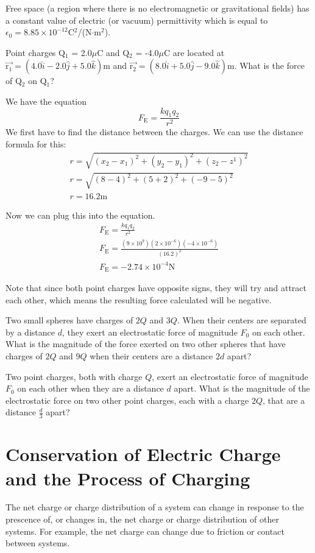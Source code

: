 \documentclass[../em.tex]{subfiles}
\begin{document}
Free space (a region where there is no electromagnetic or gravitational fields) has a 
constant value of electric (or vacuum) permittivity which is equal to $\epsilon_0 = 8.85\times10^{-12}$C$^2$/(N$\cdot$m$^2$).
\begin{example}
    Point charges Q$_1$ = 2.0$\mu$C and Q$_2$ = -4.0$\mu$C are located at $\vec{\text{r}_1} = (4.0\hat{i}-2.0\hat{j}+5.0\hat{k})$m and 
    $\vec{\text{r}_2} = (8.0\hat{i}+5.0\hat{j}-9.0\hat{k})$m. What is the force of Q$_2$ on Q$_1$?

    We have the equation 
    \[F_\text{E}=\frac{kq_1q_2}{r^2}\]
    We first have to find the distance between the charges. We can use the distance formula for this:
    \begin{align*}
        r = \sqrt{(x_2-x_1)^2+(y_2-y_1)^2+(z_2-z^1)^2}\\
        r = \sqrt{(8-4)^2+(5+2)^2+(-9-5)^2}\\
        r = 16.2 \text{m}
    \end{align*}

    Now we can plug this into the equation.
    \begin{align*}
        F_\text{E}=\frac{kq_1q_2}{r^2}\\
        F_\text{E}=\frac{(9\times10^9)(2\times10^{-6})(-4\times10^{-6})}{(16.2)^2}\\
        F_\text{E}=-2.74\times10^{-4}\text{N}
    \end{align*}

    Note that since both point charges have opposite signs, they will try and attract each other, which means the resulting force calculated 
    will be negative.
\end{example}

\ex Two small spheres have charges of $2Q$ and $3Q$. When their centers are separated by a distance $d$, they exert an electrostatic force of magnitude $F_0$ on each other. What is the magnitude of the force exerted on two other spheres that have charges of $2Q$ and $9Q$ when their centers are a distance $2d$ apart? 

\ex Two point charges, both with charge $Q$, exert an electrostatic force of magnitude $F_0$ on each other when they are a distance $d$ apart. What is the magnitude of the electrostatic force on two other point charges, each with a charge $2Q$, that are a distance $\frac{d}{3}$ apart?

\section{Conservation of Electric Charge and the Process of Charging}
The net charge or charge distribution of a system can change in response to the prescence of, 
or changes in, the net charge or charge distribution of other systems. For example, the net charge 
can change due to friction or contact between systems.
\end{document}
